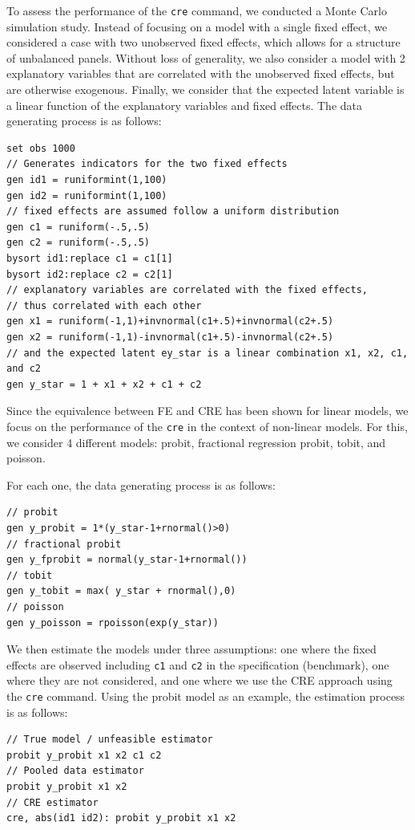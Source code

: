 \documentclass[bib]{statapress}
\begin{document}
To assess the performance of the \texttt{cre} command, we conducted a
Monte Carlo simulation study. Instead of focusing on a model with a
single fixed effect, we considered a case with two unobserved fixed
effects, which allows for a structure of unbalanced panels. Without loss
of generality, we also consider a model with 2 explanatory variables
that are correlated with the unobserved fixed effects, but are otherwise
exogenous. Finally, we consider that the expected latent variable is a
linear function of the explanatory variables and fixed effects. The data
generating process is as follows:

\begin{verbatim}
set obs 1000
// Generates indicators for the two fixed effects
gen id1 = runiformint(1,100)
gen id2 = runiformint(1,100)
// fixed effects are assumed follow a uniform distribution
gen c1 = runiform(-.5,.5)
gen c2 = runiform(-.5,.5)
bysort id1:replace c1 = c1[1]
bysort id2:replace c2 = c2[1] 
// explanatory variables are correlated with the fixed effects, 
// thus correlated with each other
gen x1 = runiform(-1,1)+invnormal(c1+.5)+invnormal(c2+.5)
gen x2 = runiform(-1,1)-invnormal(c1+.5)-invnormal(c2+.5)
// and the expected latent ey_star is a linear combination x1, x2, c1, and c2
gen y_star = 1 + x1 + x2 + c1 + c2
\end{verbatim}

Since the equivalence between FE and CRE has been shown for linear
models, we focus on the performance of the \texttt{cre} in the context
of non-linear models. For this, we consider 4 different models: probit,
fractional regression probit, tobit, and poisson.

For each one, the data generating process is as follows:

\begin{verbatim}
// probit
gen y_probit = 1*(y_star-1+rnormal()>0)
// fractional probit
gen y_fprobit = normal(y_star-1+rnormal())
// tobit
gen y_tobit = max( y_star + rnormal(),0)
// poisson
gen y_poisson = rpoisson(exp(y_star))
\end{verbatim}

We then estimate the models under three assumptions: one where the fixed
effects are observed including \texttt{c1} and \texttt{c2} in the
specification (benchmark), one where they are not considered, and one
where we use the CRE approach using the \texttt{cre} command. Using the
probit model as an example, the estimation process is as follows:

\begin{verbatim}
// True model / unfeasible estimator
probit y_probit x1 x2 c1 c2
// Pooled data estimator
probit y_probit x1 x2
// CRE estimator
cre, abs(id1 id2): probit y_probit x1 x2 
\end{verbatim}
\end{document}
